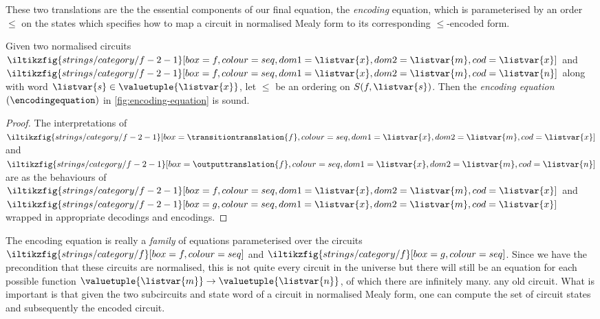 These two translations are the the essential components of our final equation,
the \emph{encoding} equation, which is parameterised by an order \(\leq\) on the
states which specifies how to map a circuit in normalised Mealy form to
its corresponding \(\leq\)-encoded form.

\begin{proposition}\label{prop:encoding-equation}
    Given two normalised circuits \(
    \iltikzfig{strings/category/f-2-1}[box=f,colour=seq,dom1=\listvar{x},dom2=\listvar{m},cod=\listvar{x}]
    \) and \(
    \iltikzfig{strings/category/f-2-1}[box=f,colour=seq,dom1=\listvar{x},dom2=\listvar{m},cod=\listvar{n}]
    \) along with word \(\listvar{s} \in \valuetuple{\listvar{x}}\), let
    \(\leq\) be an ordering on \(S(f,\listvar{s})\).
    Then the \emph{encoding equation} \((\encodingequation)\) in
    \cref{fig:encoding-equation} is sound.
\end{proposition}
\begin{proof}
    The interpretations of \(
    \iltikzfig{strings/category/f-2-1}[box={\transitiontranslation{f}},colour=seq,dom1=\listvar{x},dom2=\listvar{m},cod=\listvar{x}]
    \) and \(
    \iltikzfig{strings/category/f-2-1}[box={\outputtranslation{f}},colour=seq,dom1=\listvar{x},dom2=\listvar{m},cod=\listvar{n}]
    \) are as the behaviours of \(
    \iltikzfig{strings/category/f-2-1}[box={f},colour=seq,dom1=\listvar{x},dom2=\listvar{m},cod=\listvar{x}]
    \) and \(
    \iltikzfig{strings/category/f-2-1}[box={g},colour=seq,dom1=\listvar{x},dom2=\listvar{m},cod=\listvar{x}]
    \) wrapped in appropriate decodings and encodings.
\end{proof}



\begin{remark}
    The encoding equation is really a \emph{family} of equations parameterised
    over the circuits \(
    \iltikzfig{strings/category/f}[box=f,colour=seq]
    \) and \(
    \iltikzfig{strings/category/f}[box=g,colour=seq]
    \).
    Since we have the precondition that these circuits are normalised, this is
    not quite every circuit in the universe but there will still be an equation
    for each possible function \(
    \valuetuple{\listvar{m}} \to \valuetuple{\listvar{n}}
    \), of which there are infinitely many.
    any old circuit.
    What is important is that given the two subcircuits and state word of a
    circuit in normalised Mealy form, one can compute the set of circuit states
    and subsequently the encoded circuit.
\end{remark}

